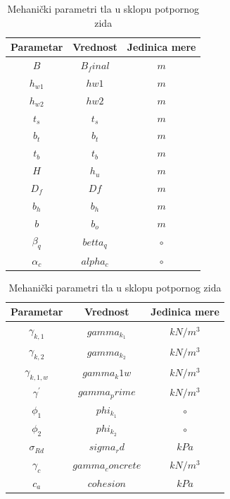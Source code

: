 \documentclass[a4paper, 11pt]{article}
\begin{document}
\begin{table}[h]
\centering
\begin{minipage}{0.40\textwidth}
\centering
\begin{tabular}{|c|c|c|}
\hline
Parametar & Vrednost & Jedinica mere \\
\hline
$B$ & $B_final$ & $m$ \\
\hline
$h_{w1}$ & $hw1$ & $m$ \\
\hline
$h_{w2}$ & $hw2$ & $m$ \\
\hline
$t_{s}$ & $t_s$ & $m$ \\
\hline
$b_{t}$ & $b_t$ & $m$ \\
\hline
$t_{b}$ & $t_b$ & $m$ \\
\hline
$H$ & $h_u$ & $m$ \\
\hline
$D_{f}$ & $Df$ & $m$ \\
\hline
$b_{h}$ & $b_h$ & $m$ \\
\hline
$b$ & $b_o$ & $m$ \\
\hline
$\beta_{q}$ & $betta_q$ & $\circ$\\
\hline
$\alpha_{c}$ & $alpha_c$ & $\circ$\\
\hline
\end{tabular}
\caption{Geometrijiski parametri potpornog zida}
\label{tab:geometrijiski_parametri}
\end{minipage}
\hfill
\begin{minipage}{0.40\textwidth}
\centering
\begin{tabular}{|c|c|c|}
\hline
Parametar & Vrednost & Jedinica mere \\
\hline
$\gamma_{k,1}$ & $gamma_k_1$ & $kN/m^3$ \\
\hline
$\gamma_{k,2}$ & $gamma_k_2$ & $kN/m^3$ \\
\hline
$\gamma_{k,1,w}$ & $gamma_k1w$ & $kN/m^3$ \\
\hline
$\gamma^{'}$ & $gamma_prime$ & $kN/m^3$ \\
\hline
$\phi_{1}$ & $phi_k_1$ & $\circ$ \\
\hline
$\phi_{2}$ & $phi_k_2$ & $\circ$ \\
\hline
$\sigma_{Rd}$ & $sigma_rd$ & $kPa$ \\
\hline
$\gamma_{c}$ & $gamma_concrete $ & $kN/m^3$ \\
\hline
$c_{a}$ & $cohesion$ & $kPa$\\
\hline
\end{tabular}
\caption{Mehani\v{c}ki parametri tla u sklopu potpornog zida}
\label{tab:mehanicki_parametri}
\end{minipage}
\end{table}
\end{document}
